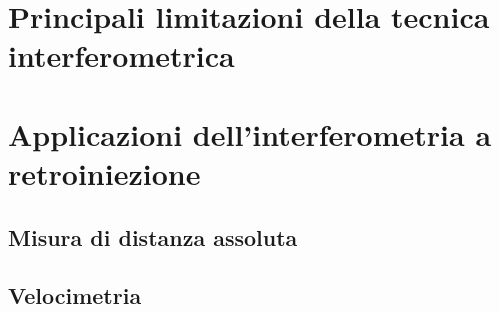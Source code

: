 \section{Principali limitazioni della tecnica interferometrica}

\section{Applicazioni dell'interferometria a retroiniezione}

\subsection{Misura di distanza assoluta}

\subsection{Velocimetria}